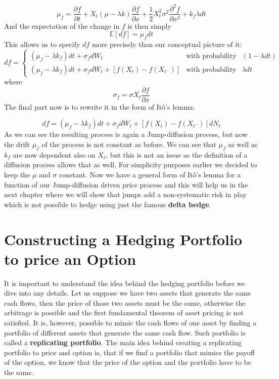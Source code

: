 \documentclass[times, utf8, diplomski]{fer}
\begin{document}
\begin{equation}
	\mu_f = \frac{\partial f}{\partial t} + X_t(\mu - \lambda k)\frac{\partial f}{\partial x} + \frac{1}{2}X_t^2\sigma^2\frac{\partial^2 f}{\partial x^2} + k_f \lambda dt
\end{equation}
And the expectation of the change in $f$ is then simply
$$
	\mathbb{E}[df] = \mu_f dt
$$
This allows us to specify $df$ more precisely than our conceptual picture of it:
$$
	df = \left\{  \begin{array}{lcl} (\mu_f - \lambda k_f)dt + \sigma_f dW_t & \mbox{with probability} & (1 - \lambda dt) \\
			  (\mu_f - \lambda k_f)dt + \sigma_f dW_t + [f(X_t) - f(X_{t^-})] & \mbox{with probability} & \lambda dt \end{array} \right. 
$$ where $$ \sigma_f = \sigma X_t\frac{\partial f}{\partial x} $$
The final part now is to rewrite it in the form of It\^{o}'s lemma:

\begin{equation} \label{eqn_ito_lemma_jd}
	df = (\mu_f - \lambda k_f)dt + \sigma_f dW_t + [f(X_t) - f(X_{t^-})]dN_t
\end{equation}
As we can see the resulting process is again a Jump-diffusion process, but now the drift $\mu_f$ of the process is not constant as before. We can see that $\mu_f$ as well as $k_f$ are now dependent also on $X_t$, but this is not an issue as the definition of a diffusion process allows that as well. For simplicity purposes earlier we decided to keep the $\mu$ and $\sigma$ constant. Now we have a general form of It\^{o}'s lemma for a function of our Jump-diffusion driven price process and this will help us in the next chapter where we will show that jumps add a non-systematic risk in play which is not possible to hedge using just the famous \textbf{delta hedge}.

\section{Constructing a Hedging Portfolio to price an Option}
It is important to understand the idea behind the hedging portfolio before we dive into any details. Let us suppose we have two assets that generate the same cash flows, then the price of those two assets must be the same, otherwise the arbitrage is possible and the first fundamental theorem of asset pricing is not satisfied. It is, however, possible to mimic the cash flows of one asset by finding a portfolio of different assets that generate the same cash flow. Such portfolio is called a \textbf{replicating portfolio}. The main idea behind creating a replicating portfolio to price and option is, that if we find a portfolio that mimics the payoff of the option, we know that the price of the option and the portfolio have to be the same.
\end{document}
